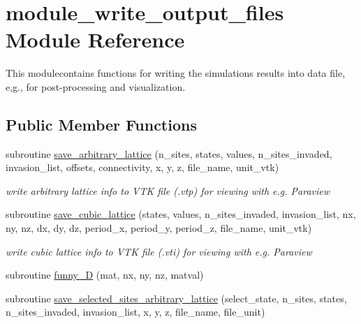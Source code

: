 \hypertarget{classmodule__write__output__files}{
\section{module\-\_\-write\-\_\-output\-\_\-files \-Module \-Reference}
\label{classmodule__write__output__files}
}


\-This modulecontains functions for writing the simulations results into data file, e,g., for post-\/processing and visualization.  


\subsection*{\-Public \-Member \-Functions}
\begin{DoxyCompactItemize}
\item 
subroutine \hyperlink{classmodule__write__output__files_a7eaf6a7a72042af7e798b22cbb31c7a6}{save\-\_\-arbitrary\-\_\-lattice} (n\-\_\-sites, states, values, n\-\_\-sites\-\_\-invaded, invasion\-\_\-list, offsets, connectivity, x, y, z, file\-\_\-name, unit\-\_\-vtk)
\begin{DoxyCompactList}\small\item\em write arbitrary lattice info to \-V\-T\-K file (.vtp) for viewing with e.\-g. \-Paraview \end{DoxyCompactList}\item 
subroutine \hyperlink{classmodule__write__output__files_a797815f313c92d6f89153b98218acb93}{save\-\_\-cubic\-\_\-lattice} (states, values, n\-\_\-sites\-\_\-invaded, invasion\-\_\-list, nx, ny, nz, dx, dy, dz, period\-\_\-x, period\-\_\-y, period\-\_\-z, file\-\_\-name, unit\-\_\-vtk)
\begin{DoxyCompactList}\small\item\em write cubic lattice info to \-V\-T\-K file (.vti) for viewing with e.\-g. \-Paraview \end{DoxyCompactList}\item 
subroutine \hyperlink{classmodule__write__output__files_a142e1aedf3a8689d5a8741677c83140d}{funny\-\_\-D} (mat, nx, ny, nz, matval)
\item 
subroutine \hyperlink{classmodule__write__output__files_a11e4aabe30309ad685551fecf4cdf068}{save\-\_\-selected\-\_\-sites\-\_\-arbitrary\-\_\-lattice} (select\-\_\-state, n\-\_\-sites, states, n\-\_\-sites\-\_\-invaded, invasion\-\_\-list, x, y, z, file\-\_\-name, file\-\_\-unit)
\item 

\end{DoxyCompactItemize}
